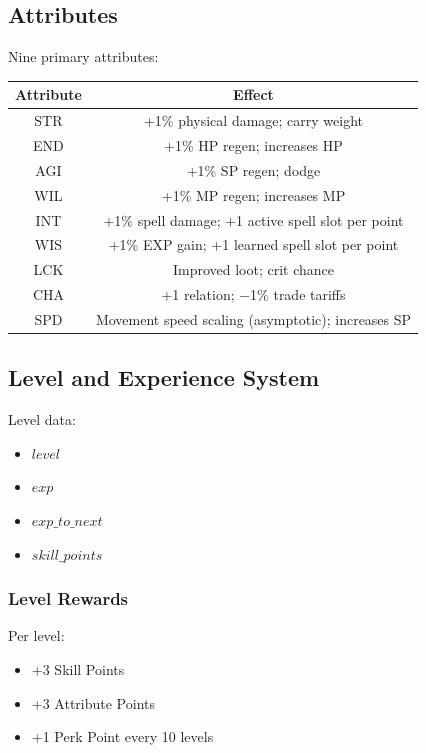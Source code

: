\documentclass[a4paper,12pt]{article}
\begin{document}
\subsection{Attributes}

Nine primary attributes:

\begin{table}[H]
\centering
\begin{tabular}{|c|c|}
\hline
Attribute & Effect \\
\hline
STR & +1\% physical damage; carry weight \\
END & +1\% HP regen; increases HP \\
AGI & +1\% SP regen; dodge \\
WIL & +1\% MP regen; increases MP \\
INT & +1\% spell damage; +1 active spell slot per point \\
WIS & +1\% EXP gain; +1 learned spell slot per point \\
LCK & Improved loot; crit chance \\
CHA & +1 relation; −1\% trade tariffs \\
SPD & Movement speed scaling (asymptotic); increases SP \\
\hline
\end{tabular}
\end{table}

\subsection{Level and Experience System}

Level data:

\begin{itemize}
\item $level$
\item $exp$
\item $exp\_to\_next$
\item $skill\_points$
\end{itemize}

\subsubsection{Level Rewards}

Per level:

\begin{itemize}
\item +3 Skill Points
\item +3 Attribute Points
\item +1 Perk Point every 10 levels
\end{itemize}
\end{document}
